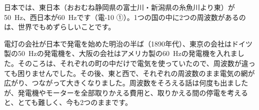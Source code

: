 \leavevmode\label{ph:電-16:sec3}日本では、東日本（おおむね静岡県の富士川・新潟県の糸魚川より東）が\qty{50}{Hz}、西日本が\qty{60}{Hz}です（電-10 ①）。1つの国の中に2つの周波数があるのは、世界でもめずらしいことです。

電灯の会社が日本で発電を始めた明治の半ば（1890年代）、東京の会社はドイツ製の\qty{50}{Hz}の発電機を、大阪の会社はアメリカ製の\qty{60}{Hz}の発電機を入れました。そのころは、それぞれの町の中だけで電気を使っていたので、周波数が違っても困りませんでした。その後、東と西で、それぞれの周波数のまま電気の網が広がり、つながって大きくなりました。周波数をそろえる話は何度も出ましたが、発電機やモーターを全部取りかえる費用と、取りかえる間の停電を考えると、とても難しく、今も2つのままです。

